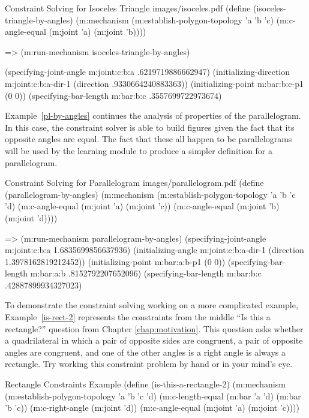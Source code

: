 \begin{pdf-example}
[label=solve-i-t]
{Constraint Solving for Isoceles Triangle}
{images/isoceles.pdf}
(define (isoceles-triangle-by-angles)
  (m:mechanism
   (m:establish-polygon-topology 'a 'b 'c)
   (m:c-angle-equal (m:joint 'a)
                    (m:joint 'b))))

=> (m:run-mechanism  isoceles-triangle-by-angles)

(specifying-joint-angle m:joint:c:b:a .6219719886662947)
(initializing-direction m:joint:c:b:a-dir-1 (direction .9330664240883363))
(initializing-point m:bar:b:c-p1 (0 0))
(specifying-bar-length m:bar:b:c .3557699722973674)
\end{pdf-example}

Example~\ref{pl-by-angles} continues the analysis of properties of the
parallelogram. In this case, the constraint solver is able to build
figures given the fact that its opposite angles are equal. The fact
that these all happen to be parallelograms will be used by the
learning module to produce a simpler definition for a parallelogram.

\enlargethispage*{-\baselineskip}

\begin{pdf-example}
[label=pl-by-angles]
{Constraint Solving for Parallelogram}
{images/parallelogram.pdf}
(define (parallelogram-by-angles)
  (m:mechanism
   (m:establish-polygon-topology 'a 'b 'c 'd)
   (m:c-angle-equal (m:joint 'a)
                    (m:joint 'c))
   (m:c-angle-equal (m:joint 'b)
                    (m:joint 'd))))

=> (m:run-mechanism parallelogram-by-angles)
(specifying-joint-angle m:joint:c:b:a 1.6835699856637936)
(initializing-angle m:joint:c:b:a-dir-1 (direction 1.3978162819212452))
(initializing-point m:bar:a:b-p1 (0 0))
(specifying-bar-length m:bar:a:b .8152792207652096)
(specifying-bar-length m:bar:b:c .42887899934327023)
\end{pdf-example}

To demonstrate the constraint solving working on a more complicated
example, Example~\ref{is-rect-2} represents the constraints from the
middle ``Is this a rectangle?'' question from Chapter
\ref{chap:motivation}. This question asks whether a quadrilateral in
which a pair of opposite sides are congruent, a pair of opposite
angles are congruent, and one of the other angles is a right angle is
always a rectangle. Try working this constraint problem by hand or in
your mind's eye.

\begin{code-example}
[label=is-rect-2]
{Rectangle Constraints Example}
(define (is-this-a-rectangle-2)
  (m:mechanism
   (m:establish-polygon-topology 'a 'b 'c 'd)
   (m:c-length-equal (m:bar 'a 'd) (m:bar 'b 'c))
   (m:c-right-angle (m:joint 'd))
   (m:c-angle-equal (m:joint 'a) (m:joint 'c))))
\end{code-example}

